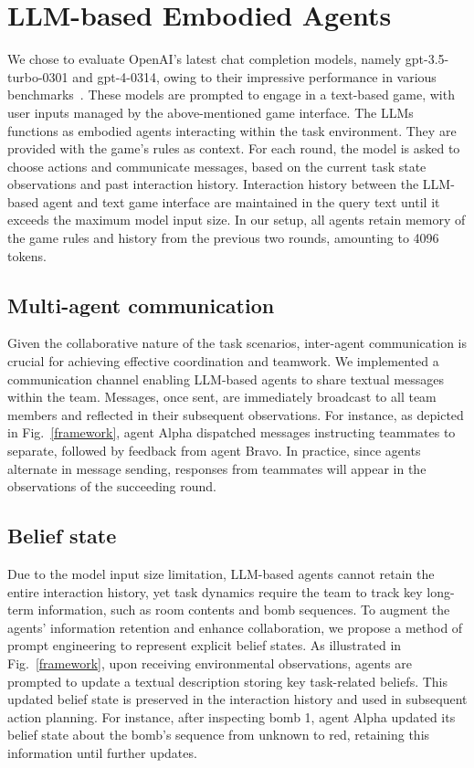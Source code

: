 \documentclass[11pt]{article}
\begin{document}
\section{LLM-based Embodied Agents}

We chose to evaluate OpenAI's latest chat completion models, namely gpt-3.5-turbo-0301 and gpt-4-0314, owing to their impressive performance in various benchmarks~\cite{zheng2023judging}. These models are prompted to engage in a text-based game, with user inputs managed by the above-mentioned game interface. The LLMs functions as embodied agents interacting within the task environment. They are provided with the game's rules as context. For each round, the model is asked to choose actions and communicate messages, based on the current task state observations and past interaction history. Interaction history between the LLM-based agent and text game interface are maintained in the query text until it exceeds the maximum model input size. In our setup, all agents retain memory of the game rules and history from the previous two rounds, amounting to 4096 tokens.
\subsection{Multi-agent communication}
Given the collaborative nature of the task scenarios, inter-agent communication is crucial for achieving effective coordination and teamwork. We implemented a communication channel enabling LLM-based agents to share textual messages within the team. Messages, once sent, are immediately broadcast to all team members and reflected in their subsequent observations. For instance, as depicted in Fig.~\ref{framework}, agent Alpha dispatched messages instructing teammates to separate, followed by feedback from agent Bravo. In practice, since agents alternate in message sending, responses from teammates will appear in the observations of the succeeding round.

\subsection{Belief state}
Due to the model input size limitation, LLM-based agents cannot retain the entire interaction history, yet task dynamics require the team to track key long-term information, such as room contents and bomb sequences. To augment the agents' information retention and enhance collaboration, we propose a method of prompt engineering to represent explicit belief states. As illustrated in Fig.~\ref{framework}, upon receiving environmental observations, agents are prompted to update a textual description storing key task-related beliefs. This updated belief state is preserved in the interaction history and used in subsequent action planning. For instance, after inspecting bomb 1, agent Alpha updated its belief state about the bomb's sequence from unknown to red, retaining this information until further updates.
\end{document}
